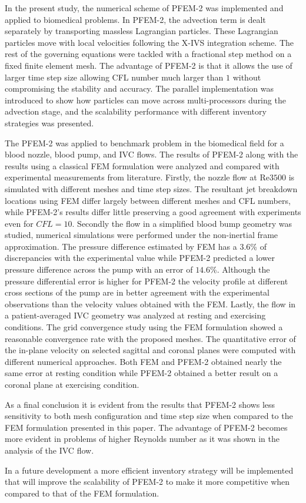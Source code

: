 In the present study, the numerical scheme of PFEM-2 was implemented and applied to biomedical problems. In PFEM-2, the advection term is dealt separately by transporting massless Lagrangian particles. These Lagrangian particles move with local velocities following the X-IVS integration scheme. The rest of the governing equations were tackled with a fractional step method on a fixed finite element mesh. The advantage of PFEM-2 is that it allows the use of larger time step size allowing CFL number much larger than $1$ without compromising the stability and accuracy. The parallel implementation was introduced to show how particles can move across multi-processors during the advection stage, and the scalability performance with different inventory strategies was presented. 

The PFEM-2 was applied to benchmark problem in the biomedical field for a blood nozzle, blood pump, and IVC flows. The results of PFEM-2 along with the results using a classical FEM formulation were analyzed and compared with experimental measurements from literature. Firstly, the nozzle flow at Re$3500$ is simulated with different meshes and time step sizes. The resultant jet breakdown locations using FEM differ largely between different meshes and CFL numbers, while PFEM-2's results differ little preserving a good agreement with experiments even for $CFL=10$. Secondly the flow in a simplified blood bump geometry was studied, numerical simulations were performed under the non-inertial frame approximation. The pressure difference estimated by FEM has a $3.6$\% of discrepancies with the experimental value while PFEM-2 predicted a lower pressure difference across the pump with an error of $14.6$\%. Although the pressure differential error is higher for PFEM-2 the velocity profile at different cross sections of the pump are in better agreement with the experimental observations than the velocity values obtained with the FEM. Lastly, the flow in a patient-averaged IVC geometry was analyzed at resting and exercising conditions. The grid convergence study using the FEM formulation showed a reasonable convergence rate with the proposed meshes. The quantitative error of the in-plane velocity on selected sagittal and coronal planes were computed with different numerical approaches. Both FEM and PFEM-2 obtained nearly the same error at resting condition while PFEM-2 obtained a better result on a coronal plane at exercising condition.

As a final conclusion it is evident from the results that PFEM-2 shows less sensitivity to both mesh configuration and time step size when compared to the FEM formulation presented in this paper. The advantage of PFEM-2 becomes more evident in problems of higher Reynolds number as it was shown in the analysis of the IVC flow.

In a future development a more efficient inventory strategy will be implemented that will improve the scalability of PFEM-2 to make it more competitive when compared to that of the FEM formulation.
